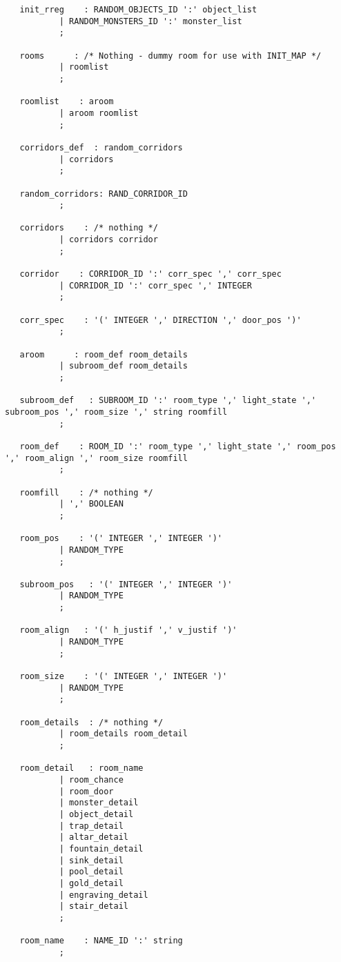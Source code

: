 \documentclass[11pt]{article}
\begin{document}
\begin{verbatim}
   init_rreg    : RANDOM_OBJECTS_ID ':' object_list
           | RANDOM_MONSTERS_ID ':' monster_list
           ;

   rooms      : /* Nothing - dummy room for use with INIT_MAP */
           | roomlist
           ;

   roomlist    : aroom
           | aroom roomlist
           ;

   corridors_def  : random_corridors
           | corridors
           ;

   random_corridors: RAND_CORRIDOR_ID
           ;

   corridors    : /* nothing */
           | corridors corridor
           ;

   corridor    : CORRIDOR_ID ':' corr_spec ',' corr_spec
           | CORRIDOR_ID ':' corr_spec ',' INTEGER
           ;

   corr_spec    : '(' INTEGER ',' DIRECTION ',' door_pos ')'
           ;

   aroom      : room_def room_details
           | subroom_def room_details
           ;

   subroom_def   : SUBROOM_ID ':' room_type ',' light_state ',' subroom_pos ',' room_size ',' string roomfill
           ;

   room_def    : ROOM_ID ':' room_type ',' light_state ',' room_pos ',' room_align ',' room_size roomfill
           ;

   roomfill    : /* nothing */
           | ',' BOOLEAN
           ;

   room_pos    : '(' INTEGER ',' INTEGER ')'
           | RANDOM_TYPE
           ;

   subroom_pos   : '(' INTEGER ',' INTEGER ')'
           | RANDOM_TYPE
           ;

   room_align   : '(' h_justif ',' v_justif ')'
           | RANDOM_TYPE
           ;

   room_size    : '(' INTEGER ',' INTEGER ')'
           | RANDOM_TYPE
           ;

   room_details  : /* nothing */
           | room_details room_detail
           ;

   room_detail   : room_name
           | room_chance
           | room_door
           | monster_detail
           | object_detail
           | trap_detail
           | altar_detail
           | fountain_detail
           | sink_detail
           | pool_detail
           | gold_detail
           | engraving_detail
           | stair_detail
           ;

   room_name    : NAME_ID ':' string
           ;


\end{verbatim}
\end{document}
